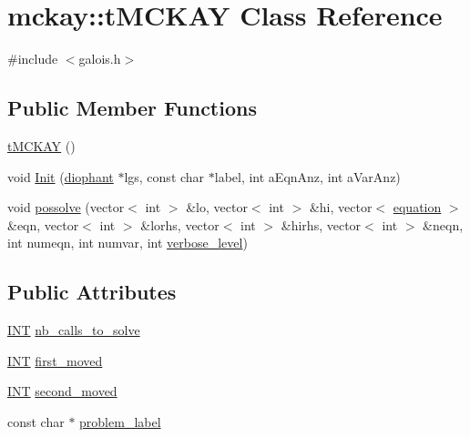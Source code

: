 \hypertarget{classmckay_1_1t_m_c_k_a_y}{}\section{mckay\+:\+:t\+M\+C\+K\+AY Class Reference}
\label{classmckay_1_1t_m_c_k_a_y}


{\ttfamily \#include $<$galois.\+h$>$}

\subsection*{Public Member Functions}
\begin{DoxyCompactItemize}
\item 
\mbox{\hyperlink{classmckay_1_1t_m_c_k_a_y_a06d898c12ad8b7660e567044a84d9c91}{t\+M\+C\+K\+AY}} ()
\item 
void \mbox{\hyperlink{classmckay_1_1t_m_c_k_a_y_a04d009389cf387ded3ff067ff0f0588d}{Init}} (\mbox{\hyperlink{classdiophant}{diophant}} $\ast$lgs, const char $\ast$label, int a\+Eqn\+Anz, int a\+Var\+Anz)
\item 
void \mbox{\hyperlink{classmckay_1_1t_m_c_k_a_y_a1791dc846f3d51ac42c1afdd9b944864}{possolve}} (vector$<$ int $>$ \&lo, vector$<$ int $>$ \&hi, vector$<$ \mbox{\hyperlink{namespacemckay_a4f7cb66ed07fe573b2b08e73ab462c1a}{equation}} $>$ \&eqn, vector$<$ int $>$ \&lorhs, vector$<$ int $>$ \&hirhs, vector$<$ int $>$ \&neqn, int numeqn, int numvar, int \mbox{\hyperlink{simeon_8_c_a818073fbcc2f439e7c56952f67386122}{verbose\+\_\+level}})
\end{DoxyCompactItemize}
\subsection*{Public Attributes}
\begin{DoxyCompactItemize}
\item 
\mbox{\hyperlink{galois_8h_a09fddde158a3a20bd2dcadb609de11dc}{I\+NT}} \mbox{\hyperlink{classmckay_1_1t_m_c_k_a_y_a5def35a9348d8d7b98fba2ea773d4bca}{nb\+\_\+calls\+\_\+to\+\_\+solve}}
\item 
\mbox{\hyperlink{galois_8h_a09fddde158a3a20bd2dcadb609de11dc}{I\+NT}} \mbox{\hyperlink{classmckay_1_1t_m_c_k_a_y_a21648ad9b36a45c57df37e4929c5e87b}{first\+\_\+moved}}
\item 
\mbox{\hyperlink{galois_8h_a09fddde158a3a20bd2dcadb609de11dc}{I\+NT}} \mbox{\hyperlink{classmckay_1_1t_m_c_k_a_y_a2ea81d257de073b61b11cb4525bf6691}{second\+\_\+moved}}
\item 
const char $\ast$ \mbox{\hyperlink{classmckay_1_1t_m_c_k_a_y_af023281b578951479c028925fb942f4d}{problem\+\_\+label}}
\end{DoxyCompactItemize}
